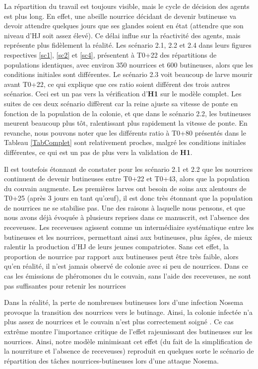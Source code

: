 		
		La répartition du travail est toujours visible, mais le cycle de décision des agents est plus long. En effet, une abeille nourrice décidant de devenir butineuse va devoir attendre quelques jours que ses glandes soient en état (attendre que son niveau d'HJ soit assez élevé). Ce délai influe sur la réactivité des agents, mais représente plus fidèlement la réalité. Les scénario 2.1, 2.2 et 2.4 dans leurs figures respectives \ref{sc1}, \ref{sc2} et \ref{sc4}, présentent à T0+22 des répartitions de populations identiques, avec environ 350 nourrices et 600 butineuses, alors que les conditions initiales sont différentes. Le scénario 2.3 voit beaucoup de larve mourir avant T0+22, ce qui explique que ces ratio soient différent des trois autres scénarios. Ceci est un pas vers la vérification d'\textbf{H1} sur le modèle complet. Les suites de ces deux scénario diffèrent car la reine ajuste sa vitesse de ponte en fonction de la population de la colonie, et que dans le scénario 2.2, les butineuses meurent beaucoup plus tôt, ralentissant plus rapidement la vitesse de ponte. En revanche, nous pouvons noter que les différents ratio à T0+80 présentés dans le Tableau \ref{TabComplet} sont relativement proches, malgré les conditions initiales différentes, ce qui est un pas de plus vers la validation de \textbf{H1}.
		
		Il est toutefois étonnant de constater pour les scénario 2.1 et 2.2 que les nourrices continuent de devenir butineuses entre T0+22 et T0+43, alors que la population du couvain augmente. Les premières larves ont besoin de soins aux alentours de T0+25 (après 3 jours en tant qu'œuf), il est donc très étonnant que la population de nourrices ne se stabilise pas. Une des raisons à laquelle nous pensons, et que nous avons déjà évoquée à plusieurs reprises dans ce manuscrit, est l'absence des receveuses. Les receveuses agissent comme un intermédiaire systématique entre les butineuses et les nourrices, permettant ainsi aux butineuses, plus âgées, de mieux ralentir la production d'HJ de leurs jeunes compatriotes. Sans cet effet, la proportion de nourrice par rapport aux butineuses peut être très faible, alors qu'en réalité, il n'est jamais observé de colonie avec si peu de nourrices. Dans ce cas les émissions de phéromones du le couvain, sans l'aide des receveuses, ne sont pas suffisantes pour retenir les nourrices
		
		 Dans la réalité, la perte de nombreuses butineuses lors d'une infection Nosema provoque la transition des nourrices vers le butinage. Ainsi, la colonie infectée n'a plus assez de nourrices et le couvain n'est plus correctement soigné \cite{hassanein_influence_1953, higes_how_2008}. Ce cas extrême montre l'importance critique de l'effet rajeunissant des butineuses sur les nourrices. Ainsi, notre modèle minimisant cet effet (du fait de la simplification de la nourriture et l'absence de receveuses) reproduit en quelques sorte le scénario de répartition des tâches nourrices-butineuses lors d'une attaque Nosema.	
		 
